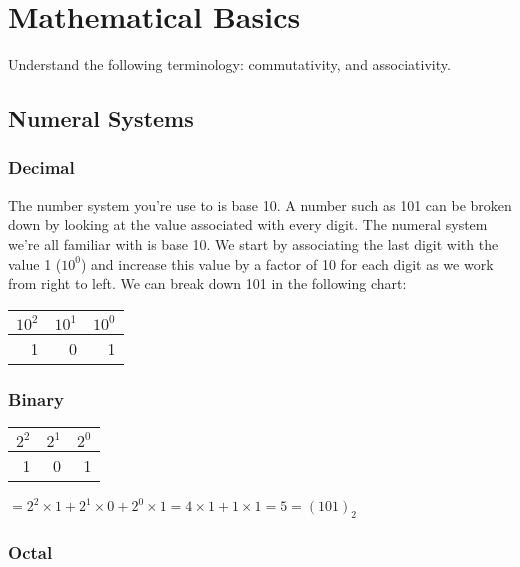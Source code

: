 \chapter{Mathematical Basics}

Understand the following terminology: commutativity, and associativity.

\section{Numeral Systems}

\subsection{Decimal}

The number system you're use to is base 10. A number such as 101 can be broken
down by looking at the value associated with every digit. The numeral system
we're all familiar with is base 10. We start by associating the last digit with
the value 1 ($10^0$) and increase this value by a factor of 10 for each digit
as we work from right to left. We can break down 101 in the following chart:

\begin{center}
  \begin{tabular}{r | r | r}
    $10^2$ & $10^1$ & $10^0$ \\
    \hline
         1 &      0 &      1 \\
  \end{tabular}
\end{center}

\label{sec:numeral-system-binary}
\subsection{Binary}

\begin{center}
  \begin{tabular}{r | r | r}
    $2^2$ & $2^1$ & $2^0$ \\
    \hline
        1 &      0 &      1 \\
  \end{tabular}

  \vspace{1em}

  $= 2^2 \times 1 + 2^1 \times 0 + 2^0 \times 1 = 4 \times 1 + 1 \times 1 = 5
   = (101)_2$
\end{center}

\subsection{Octal}

